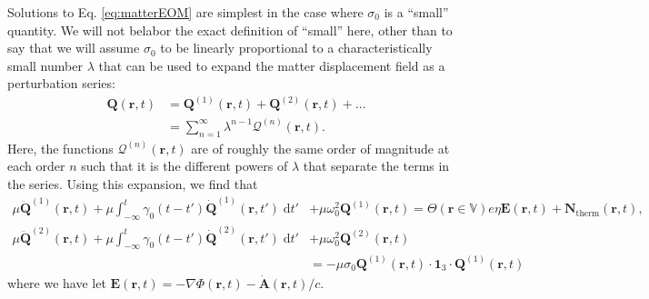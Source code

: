 Solutions to Eq. \eqref{eq:matterEOM} are simplest in the case where $\sigma_0$ is a ``small'' quantity. We will not belabor the exact definition of ``small'' here, other than to say that we will assume $\sigma_0$ to be linearly proportional to a characteristically small number $\lambda$ that can be used to expand the matter displacement field as a perturbation series:
\begin{equation}
\begin{split}
\mathbf{Q}(\mathbf{r},t) &= \mathbf{Q}^{(1)}(\mathbf{r},t) + \mathbf{Q}^{(2)}(\mathbf{r},t) + \ldots\\
&= \sum_{n = 1}^\infty\lambda^{n-1}\bm{\mathcal{Q}}^{(n)}(\mathbf{r},t).
\end{split}
\end{equation}
Here, the functions $\bm{\mathcal{Q}}^{(n)}(\mathbf{r},t)$ are of roughly the same order of magnitude at each order $n$ such that it is the different powers of $\lambda$ that separate the terms in the series. Using this expansion, we find that
\begin{equation}\label{eq:matterEOM2}
\begin{split}
\mu\ddot{\mathbf{Q}}^{(1)}(\mathbf{r},t) + \mu\int_{-\infty}^t\gamma_0(t - t')\dot{\mathbf{Q}}^{(1)}(\mathbf{r},t')\;\mathrm{d}t' &+ \mu\omega_0^2\mathbf{Q}^{(1)}(\mathbf{r},t) = \Theta(\mathbf{r}\in\mathbb{V})e\eta\mathbf{E}(\mathbf{r},t) + \mathbf{N}_\mathrm{therm}(\mathbf{r},t),\\
\mu\ddot{\mathbf{Q}}^{(2)}(\mathbf{r},t) + \mu\int_{-\infty}^t\gamma_0(t - t')\dot{\mathbf{Q}}^{(2)}(\mathbf{r},t')\;\mathrm{d}t'
&+ \mu\omega_0^2\mathbf{Q}^{(2)}(\mathbf{r},t)\\
&= -\mu\sigma_0\mathbf{Q}^{(1)}(\mathbf{r},t)\cdot\bm{1}_3\cdot\mathbf{Q}^{(1)}(\mathbf{r},t)
\end{split}
\end{equation}
where we have let $\mathbf{E}(\mathbf{r},t) = -\nabla\Phi(\mathbf{r},t) - \dot{\mathbf{A}}(\mathbf{r},t)/c$.

